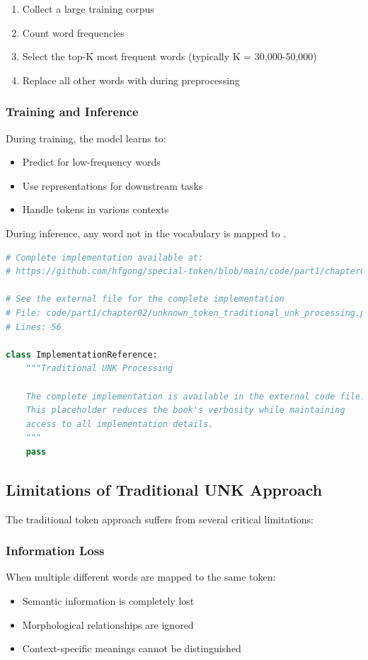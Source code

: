\begin{enumerate}
\item Collect a large training corpus
\item Count word frequencies
\item Select the top-K most frequent words (typically K = 30,000-50,000)
\item Replace all other words with \unk{} during preprocessing
\end{enumerate}

\subsubsection{Training and Inference}
During training, the model learns to:
\begin{itemize}
\item Predict \unk{} for low-frequency words
\item Use \unk{} representations for downstream tasks
\item Handle \unk{} tokens in various contexts
\end{itemize}

During inference, any word not in the vocabulary is mapped to \unk{}.

\begin{lstlisting}[language=Python, caption={Traditional UNK Processing}]
# Complete implementation available at:
# https://github.com/hfgong/special-token/blob/main/code/part1/chapter02/unknown_token_traditional_unk_processing.py

# See the external file for the complete implementation
# File: code/part1/chapter02/unknown_token_traditional_unk_processing.py
# Lines: 56

class ImplementationReference:
    """Traditional UNK Processing
    
    The complete implementation is available in the external code file.
    This placeholder reduces the book's verbosity while maintaining
    access to all implementation details.
    """
    pass
\end{lstlisting}

\subsection{Limitations of Traditional UNK Approach}

The traditional \unk{} token approach suffers from several critical limitations:

\subsubsection{Information Loss}
When multiple different words are mapped to the same \unk{} token:
\begin{itemize}
\item Semantic information is completely lost
\item Morphological relationships are ignored
\item Context-specific meanings cannot be distinguished
\end{itemize}

